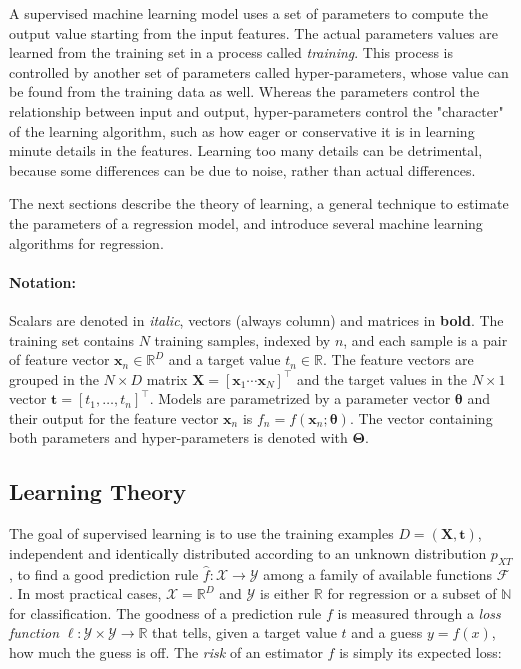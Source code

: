 \documentclass[a4paper]{book}
\begin{document}
A supervised machine learning model uses a set of parameters to compute the output value starting from the input features. The actual parameters values are learned from the training set in a process called \emph{training}. This process is controlled by another set of parameters called hyper-parameters, whose value can be found from the training data as well. Whereas the parameters control the relationship between input and output, hyper-parameters control the "character" of the learning algorithm, such as how eager or conservative it is in learning minute details in the features. Learning too many details can be detrimental, because some differences can be due to noise, rather than actual differences.

The next sections describe the theory of learning, a general technique to estimate the parameters of a regression model, and introduce several machine learning algorithms for regression.

\paragraph{Notation:} Scalars are denoted in \textit{italic}, vectors (always column) and matrices in \textbf{bold}. The training set contains $N$ training samples, indexed by $n$, and each sample is a pair of feature vector $\bm x_n\in\mathbb{R}^D$ and a target value $t_n\in\mathbb{R}$. The feature vectors are grouped in the $N\times D$ matrix $\bm X=\left[\bm x_1\dotsb\bm x_N\right]^\intercal$ and the target values in the $N\times 1$ vector $\bm t=\left[t_1,\ldots,t_n\right]^\intercal$. Models are parametrized by a parameter vector $\bm\theta$ and their output for the feature vector $\bm x_n$ is $f_n=f(\bm x_n;\bm\theta)$. The vector containing both parameters and hyper-parameters is denoted with $\bm\Theta$.

\subsection{Learning Theory}
The goal of supervised learning is to use the training examples $D=(\bm X, \bm t)$, independent and identically distributed according to an unknown distribution $p_{XT}$, to find a good prediction rule $\hat{f}:\mathcal{X}\rightarrow\mathcal{Y}$ among a family of available functions $\mathcal{F}$. In most practical cases, $\mathcal{X}=\mathbb{R}^D$ and $\mathcal{Y}$ is either $\mathbb{R}$ for regression or a subset of $\mathbb{N}$ for classification. The goodness of a prediction rule $f$ is measured through a \emph{loss function} $\ell:\mathcal{Y}\times\mathcal{Y}\rightarrow\mathbb{R}$ that tells, given a target value $t$ and a guess $y=f(x)$, how much the guess is off. The \emph{risk} of an estimator $f$ is simply its expected loss:
\end{document}
